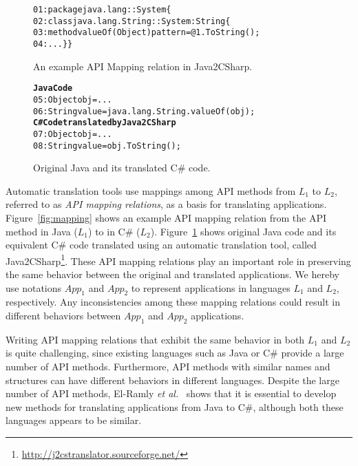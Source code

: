 \begin{figure}[t]
\begin{CodeOut}%
\begin{alltt}
01: package java.lang::System\{
02:   class java.lang.String :: System:String\{
03:   method valueOf(Object) { pattern = @1.ToString(); }
04:   ...\}\}
\end{alltt}
\end{CodeOut}\vspace*{-4ex}
\caption{\label{fig:mapping} An example API Mapping relation in Java2CSharp.}\vspace*{-2ex}
\begin{CodeOut}%
\begin{alltt}
\textbf{Java Code}
05:  Object obj = ...
06:  String value = java.lang.String.valueOf(obj);
\textbf{C# Code translated by Java2CSharp}
07:  Object obj = ...
08:  String value = obj.ToString();
\end{alltt}
\end{CodeOut}\vspace*{-4ex}
\caption{\label{fig:transcode}Original Java and its translated C\# code.}\vspace*{-4ex}
\end{figure}

Automatic translation tools use mappings among API methods from $L_1$ to $L_2$, referred to as \emph{API mapping relations}, as a basis for translating applications. Figure~\ref{fig:mapping} shows an example API mapping relation from the API method  in Java ($L_1$) to  in C\# ($L_2$). Figure~\ref{fig:transcode} shows original Java code and its equivalent C\# code translated using an automatic translation tool, called Java2CSharp\footnote{\url{http://j2cstranslator.sourceforge.net/}}. These API mapping relations play an important role in preserving the same behavior between the original and translated applications. We hereby use notations $App_1$ and $App_2$ to represent applications in languages $L_1$ and $L_2$, respectively. Any inconsistencies among these mapping relations could result in different behaviors between $App_1$ and $App_2$ applications.

Writing API mapping relations that exhibit the same behavior in both $L_1$ and $L_2$ is quite challenging, since existing languages such as Java or C\# provide a large number of API methods. Furthermore, API methods with similar names and structures can have different behaviors in different languages. Despite the large number of API methods, El-Ramly \emph{et al.}~\cite{el2006experiment} shows that it is essential to develop new methods for translating applications from Java to C\#, although both these languages appears to be similar.

